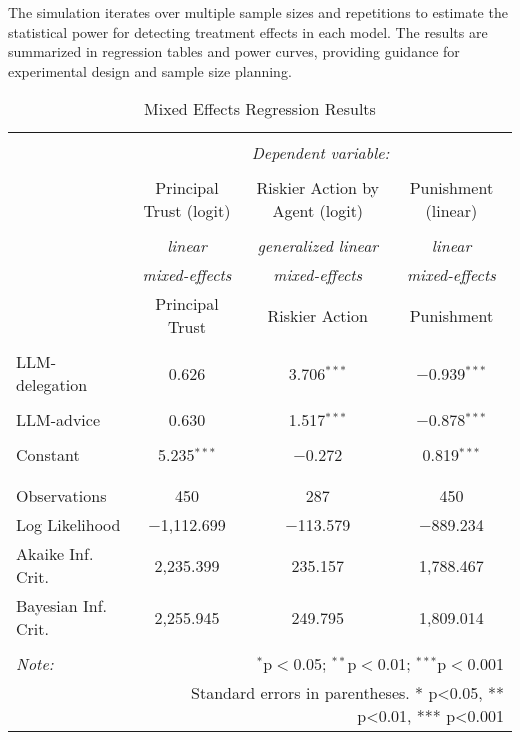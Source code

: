 \documentclass[
]{article}
\begin{document}
The simulation iterates over multiple sample sizes and repetitions to
estimate the statistical power for detecting treatment effects in each
model. The results are summarized in regression tables and power curves,
providing guidance for experimental design and sample size planning.

\begin{table}[!htbp] \centering 
  \caption{Mixed Effects Regression Results} 
  \label{} 
\begin{tabular}{@{\extracolsep{5pt}}lccc} 
\\[-1.8ex]\hline 
\hline \\[-1.8ex] 
 & \multicolumn{3}{c}{\textit{Dependent variable:}} \\ 
\cline{2-4} 
\\[-1.8ex] & Principal Trust (logit) & Riskier Action by Agent (logit) & Punishment (linear) \\ 
\\[-1.8ex] & \textit{linear} & \textit{generalized linear} & \textit{linear} \\ 
 & \textit{mixed-effects} & \textit{mixed-effects} & \textit{mixed-effects} \\ 
 & Principal Trust & Riskier Action & Punishment \\ 
\hline \\[-1.8ex] 
 LLM-delegation & 0.626 & 3.706$^{***}$ & $-$0.939$^{***}$ \\ 
  & & & \\ 
 LLM-advice & 0.630 & 1.517$^{***}$ & $-$0.878$^{***}$ \\ 
  & & & \\ 
 Constant & 5.235$^{***}$ & $-$0.272 & 0.819$^{***}$ \\ 
  & & & \\ 
\hline \\[-1.8ex] 
Observations & 450 & 287 & 450 \\ 
Log Likelihood & $-$1,112.699 & $-$113.579 & $-$889.234 \\ 
Akaike Inf. Crit. & 2,235.399 & 235.157 & 1,788.467 \\ 
Bayesian Inf. Crit. & 2,255.945 & 249.795 & 1,809.014 \\ 
\hline 
\hline \\[-1.8ex] 
\textit{Note:}  & \multicolumn{3}{r}{$^{*}$p$<$0.05; $^{**}$p$<$0.01; $^{***}$p$<$0.001} \\ 
 & \multicolumn{3}{r}{Standard errors in parentheses. * p<0.05, ** p<0.01, *** p<0.001} \\ 
\end{tabular} 
\end{table}
\end{document}
